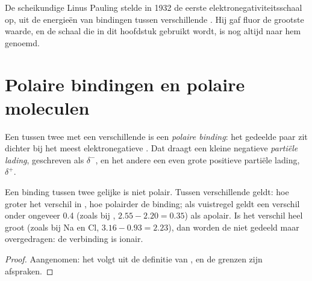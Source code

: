 \begin{history}
De scheikundige Linus Pauling stelde in 1932 de eerste
elektronegativiteitsschaal op, uit de energieën van bindingen tussen
verschillende . Hij gaf fluor de grootste waarde, en de schaal die
in dit hoofdstuk gebruikt wordt, is nog altijd naar hem genoemd.
\end{history}

\section{Polaire bindingen en polaire moleculen}

\begin{definition}\label{def:g11:polarity-and-cohesion:polar-bond}
Een  tussen twee  met een verschillende
 is een \emph{polaire binding}:
het gedeelde paar zit dichter bij het meest elektronegatieve . Dat
 draagt een kleine negatieve \emph{partiële lading},
geschreven als $\delta^-$, en het andere  een even grote positieve
partiële lading, $\delta^+$.
\end{definition}

\begin{proposition}\label{prop:g11:polarity-and-cohesion:polar-bond}
Een binding tussen twee gelijke  is niet polair. Tussen
verschillende  geldt: hoe groter het verschil in
, hoe polairder de binding; als vuistregel geldt een
verschil onder ongeveer 0.4 (zoals bij
, $2.55 - 2.20 = 0.35$) als apolair. Is het verschil heel groot
(zoals bij Na en Cl, $3.16 - 0.93 = 2.23$), dan worden de
 niet gedeeld maar overgedragen: de verbinding is ionair.
\end{proposition}

\begin{proof}
Aangenomen: het volgt uit de definitie van , en de
grenzen zijn afspraken.
\end{proof}

